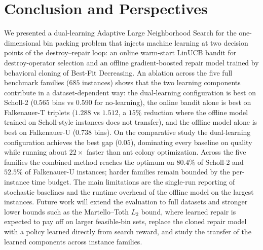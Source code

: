 \documentclass[conference]{IEEEtran}
\begin{document}
\section{Conclusion and Perspectives}\label{sec:conclusion}
We presented a dual-learning Adaptive Large Neighborhood Search for the
one-dimensional bin packing problem that injects machine learning at two decision
points of the destroy--repair loop: an online warm-start LinUCB bandit for
destroy-operator selection and an offline gradient-boosted repair model trained by
behavioral cloning of Best-Fit Decreasing. An ablation across the five full
benchmark families ($685$ instances) shows that the two learning components
contribute in a dataset-dependent way: the dual-learning configuration is best
on Scholl-2 ($0.565$ bins vs $0.590$ for no-learning), the online bandit alone
is best on Falkenauer-T triplets ($1.288$ vs $1.512$, a $15\%$ reduction
where the offline model trained on Scholl-style instances does not transfer),
and the offline model alone is best on Falkenauer-U ($0.738$ bins). On the
comparative study the dual-learning configuration achieves the best gap
($0.05$), dominating every baseline on quality while running about
$22\times$ faster than ant colony optimization. Across the five families the
combined method reaches the optimum on $80.4\%$ of Scholl-2 and $52.5\%$ of
Falkenauer-U instances; harder families remain bounded by the per-instance
time budget. The main limitations
are the single-run reporting of stochastic baselines and the runtime overhead
of the offline model on the largest instances. Future work will extend the evaluation to full datasets and stronger
lower bounds such as the Martello--Toth $L_2$ bound, where learned repair is
expected to pay off on larger feasible-bin sets, replace the cloned repair model
with a policy learned directly from search reward, and study the transfer of the
learned components across instance families.
\end{document}
